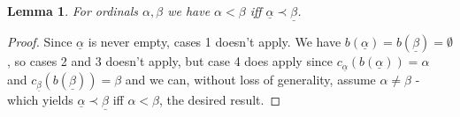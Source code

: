 \documentclass{article}
\theoremstyle{definition}
\theoremstyle{plain}
\theoremstyle{plain}
\theoremstyle{plain}
\theoremstyle{plain}
\theoremstyle{remark}
\theoremstyle{remark}
\theoremstyle{remark}
\theoremstyle{plain}
\newtheorem{lemma}[definition]{Lemma}
\theoremstyle{plain}
\begin{document}
\begin{lemma}
For ordinals $\alpha, \beta$ we have $\alpha < \beta$ iff $\underline{\alpha} \prec \underline{\beta}$.
\end{lemma}

\begin{proof}
Since $\underline{\alpha}$ is never empty, cases 1 doesn't apply. We have $b(\underline{\alpha}) = b(\underline{\beta}) = \emptyset$, so cases 2 and 3 doesn't apply, but case 4 does apply since $c_{\underline{\alpha}}(b(\underline{\alpha})) = \alpha$ and $c_{\underline{\beta}}(b(\underline{\beta})) = \beta$ and we can, without loss of generality, assume $\alpha \neq \beta$ - which yields $\underline{\alpha} \prec \underline{\beta}$ iff $\alpha < \beta$, the desired result.
\end{proof}
\end{document}
